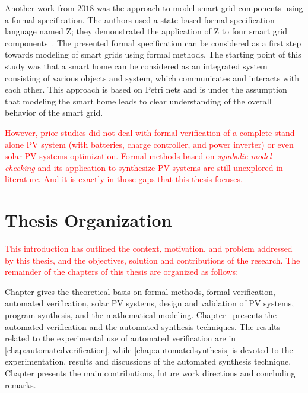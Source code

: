Another work from $2018$ was the approach to model smart grid components using a formal specification. The authors used a state-based formal specification language named Z; they demonstrated the application of Z to four smart grid components~\cite{Akram2018}. The presented formal specification can be considered as a first step towards modeling of smart grids using formal methods. The starting point of this study was that a smart home can be considered as an integrated system consisting of various objects and system, which communicates and interacts with each other. This approach is based on Petri nets and is under the assumption that modeling the smart home leads to clear understanding of the overall behavior of the smart grid.

\textcolor{red}{However, prior studies did not deal with formal verification of a complete stand-alone PV system (with batteries, charge controller, and power inverter) or even solar PV systems optimization. Formal methods based on \textit{symbolic model checking} and its application to synthesize PV systems are still unexplored in literature. And it is exactly in those gaps that this thesis focuses.}

\section{Thesis Organization}

\textcolor{red}{This introduction has outlined the context, motivation, and problem addressed by this thesis, and the objectives, solution and contributions of the research. The remainder of the chapters of this thesis are organized as follows:}

Chapter  gives the theoretical basis on formal methods, formal verification, automated verification, solar PV systems, design and validation of PV systems, program synthesis, and the mathematical modeling. Chapter~ presents the automated verification  and the automated synthesis techniques. The results related to the experimental use of automated verification are in \autoref{chap:automatedverification}, while \autoref{chap:automatedsynthesis} is devoted to the experimentation, 
results and discussions of the automated synthesis technique. Chapter  presents the main contributions, future work directions and concluding remarks.
